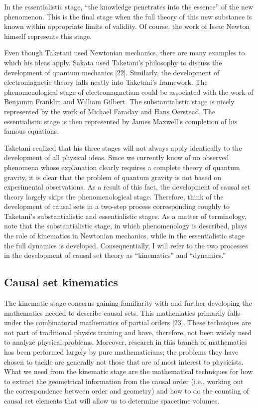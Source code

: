 In the essentialistic stage, ``the knowledge penetrates into the essence''
of the new phenomenon. This is the final stage when the full theory of this
new substance is known within appropriate limits of validity. Of course, the
work of Issac Newton himself represents this stage.

Even though Taketani used Newtonian mechanics, there are many examples to
which his ideas apply. Sakata used Taketani's philosophy to discuss the
development of quantum mechanics [22]. Similarly, the development of
electromagnetic theory falls neatly into Taketani's framework. The
phenomenological stage of electromagnetism could be associated with the work
of Benjamin Franklin and William Gilbert. The substantialistic stage is
nicely represented by the work of Michael Faraday and Hans Oerstead. The
essentialistic stage is then represented by James Maxwell's completion of
his famous equations.

Taketani realized that his three stages will not always apply identically to
the development of all physical ideas. Since we currently know of no
observed phenomena whose explanation clearly requires a complete theory of
quantum gravity, it is clear that the problem of quantum gravity is not
based on experimental observations. As a result of this fact, the
development of causal set theory largely skips the phenomenological stage.
Therefore, think of the development of causal sets in a two-step process
corresponding roughly to Taketani's substantialistic and essentialistic
stages. As a matter of terminology, note that the substantialistic stage, in
which phenomenology is described, plays the role of kinematics in Newtonian
mechanics, while in the essentialistic stage the full dynamics is developed.
Consequentially, I will refer to the two processes in the development of
causal set theory as ``kinematics'' and ``dynamics.''

\subsection{Causal set kinematics}

The kinematic stage concerns gaining familiarity with and further developing
the mathematics needed to describe causal sets. This mathematics primarily
falls under the combinatorial mathematics of partial orders [23]. These
techniques are not part of traditional physics training and have, therefore,
not been widely used to analyze physical problems. Moreover, research in
this branch of mathematics has been performed largely by pure
mathematicians; the problems they have chosen to tackle are generally not
those that are of most interest to physicists. What we need from the
kinematic stage are the mathematical techniques for how to extract the
geometrical information from the causal order (i.e., working out the
correspondence between order and geometry) and how to do the counting of
causal set elements that will allow us to determine spacetime volumes.

